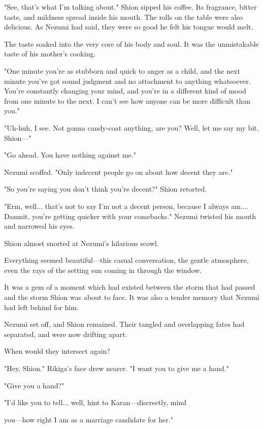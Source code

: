 "See, that's what I'm talking about." Shion sipped his coffee. Its
fragrance, bitter taste, and mildness spread inside his mouth. The rolls
on the table were also delicious. As Nezumi had said, they were so good
he felt his tongue would melt.

The taste soaked into the very core of his body and soul. It was the
unmistakable taste of his mother's cooking.

"One minute you're as stubborn and quick to anger as a child, and the
next minute you've got sound judgment and no attachment to anything
whatsoever. You're constantly changing your mind, and you're in a
different kind of mood from one minute to the next. I can't see how
anyone can be more difficult than you."

"Uh-huh, I see. Not gonna candy-coat anything, are you? Well, let me say
my bit, Shion---"

"Go ahead. You have nothing against me."

Nezumi scoffed. "Only indecent people go on about how decent they are."

"So you're saying you don't think you're decent?" Shion retorted.

"Erm, well... that's not to say I'm not a decent person, because I
always am.... Damnit, you're getting quicker with your comebacks."
Nezumi twisted his mouth and narrowed his eyes.

Shion almost snorted at Nezumi's hilarious scowl.

Everything seemed beautiful---this casual conversation, the gentle
atmosphere, even the rays of the setting sun coming in through the
window.

It was a gem of a moment which had existed between the storm that had
passed and the storm Shion was about to face. It was also a tender
memory that Nezumi had left behind for him.

\myspace

Nezumi set off, and Shion remained. Their tangled and overlapping fates
had separated, and were now drifting apart.

When would they intersect again?

"Hey, Shion." Rikiga's face drew nearer. "I want you to give me a hand."

"Give you a hand?"

"I'd like you to tell... well, hint to Karan---discreetly, mind~

you---how right I am as a marriage candidate for her."

